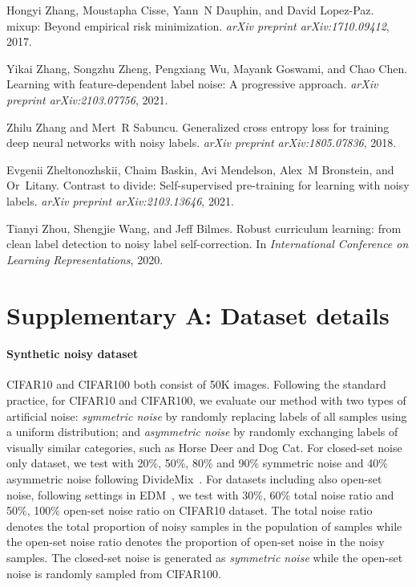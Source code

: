 \documentclass{bmvc2k}
\begin{document}
\begin{thebibliography}{46}
Hongyi Zhang, Moustapha Cisse, Yann~N Dauphin, and David Lopez-Paz.
\newblock mixup: Beyond empirical risk minimization.
\newblock \emph{arXiv preprint arXiv:1710.09412}, 2017.

Yikai Zhang, Songzhu Zheng, Pengxiang Wu, Mayank Goswami, and Chao Chen.
\newblock Learning with feature-dependent label noise: A progressive approach.
\newblock \emph{arXiv preprint arXiv:2103.07756}, 2021.

Zhilu Zhang and Mert~R Sabuncu.
\newblock Generalized cross entropy loss for training deep neural networks with
  noisy labels.
\newblock \emph{arXiv preprint arXiv:1805.07836}, 2018.

Evgenii Zheltonozhskii, Chaim Baskin, Avi Mendelson, Alex~M Bronstein, and
  Or~Litany.
\newblock Contrast to divide: Self-supervised pre-training for learning with
  noisy labels.
\newblock \emph{arXiv preprint arXiv:2103.13646}, 2021.

Tianyi Zhou, Shengjie Wang, and Jeff Bilmes.
\newblock Robust curriculum learning: from clean label detection to noisy label
  self-correction.
\newblock In \emph{International Conference on Learning Representations}, 2020.

\end{thebibliography}

\appendix
\section*{Supplementary A: Dataset details}
\label{sup:a}
\paragraph{Synthetic noisy dataset}
CIFAR10 and CIFAR100 both consist of 50K images. Following the standard practice, for CIFAR10 and CIFAR100, we evaluate our method with two types of artificial noise: \textit{symmetric noise} by randomly replacing labels of all samples using a uniform distribution; and \textit{asymmetric noise} by randomly exchanging labels of visually similar categories, such as Horse  Deer and Dog  Cat. For closed-set noise only dataset, we test with 20\%, 50\%, 80\% and 90\% symmetric noise and 40\% asymmetric noise following DivideMix~\citep{dividemix}. For datasets including also open-set noise, following settings in EDM~\citep{evidentialmix}, we test with 30\%, 60\% total noise ratio and 50\%, 100\% open-set noise ratio on CIFAR10 dataset. The total noise ratio denotes the total proportion of noisy samples in the population of samples while the open-set noise ratio denotes the proportion of open-set noise in the noisy samples. The closed-set noise is generated as \textit{symmetric noise} while the open-set noise is randomly sampled from CIFAR100.
\end{document}
